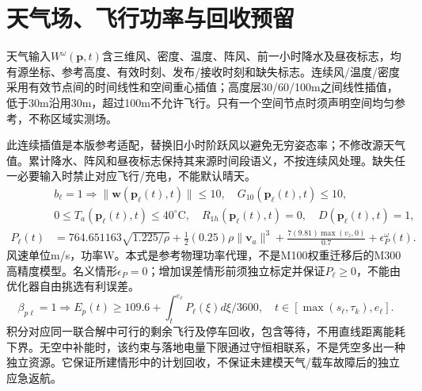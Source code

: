 \section{天气场、飞行功率与回收预留}
\noindent 天气输入$W^\omega(\mathbf p,t)$含三维风、密度、温度、阵风、前一小时降水及昼夜标志，均有源坐标、参考高度、有效时刻、发布/接收时刻和缺失标志。连续风/温度/密度采用有效节点间的时间线性和空间重心插值；高度层30/60/100m之间线性插值，低于30m沿用30m，超过100m不允许飞行。只有一个空间节点时须声明空间均匀参考，不称区域实测场。

\noindent 此连续插值是本版参考适配，替换旧小时阶跃风以避免无穷姿态率；不修改源天气值。累计降水、阵风和昼夜标志保持其来源时间段语义，不按连续风处理。缺失任一必要输入时禁止对应飞行/充电，不能默认晴天。
\begin{align}
 &b_\ell=1\Rightarrow \|\mathbf w(\mathbf p_\ell(t),t)\|\le10,\quad
 G_{10}(\mathbf p_\ell(t),t)\le10,\\
 &0\le T_a(\mathbf p_\ell(t),t)\le40^\circ\mathrm C,\quad
 R_{1h}(\mathbf p_\ell(t),t)=0,\quad D(\mathbf p_\ell(t),t)=1,
 \label{eng:eq:weatherwindow}\\
 P_\ell(t)&=764.651163\sqrt{1.225/\rho}
       +\tfrac12(0.25)\rho\|\mathbf v_a\|^3
       +\frac{7(9.81)\max(v_z,0)}{0.7}+\epsilon_P^\omega(t).
 \label{eng:eq:power}
\end{align}
\noindent 风速单位m/s，功率W。本式是参考物理功率代理，不是M100权重迁移后的M300高精度模型。名义情形$\epsilon_P=0$；增加误差情形前须独立标定并保证$P_\ell\ge0$，不能由优化器自由挑选有利误差。
\begin{equation}
 \beta_{p\ell}=1\Rightarrow E_p(t)\ge109.6+
                   \int_t^{e_\ell}P_\ell(\xi)d\xi/3600,
 \quad t\in[\max(s_\ell,\tau_k),e_\ell].
 \label{eng:eq:return}
\end{equation}
\noindent 积分对应同一联合解中可行的剩余飞行及停车回收，包含等待，不用直线距离能耗下界。无空中补能时，该约束与落地电量下限通过守恒相联系，不是凭空多出一种独立资源。它保证所建情形中的计划回收，不保证未建模天气/载车故障后的独立应急返航。
\clearpage

